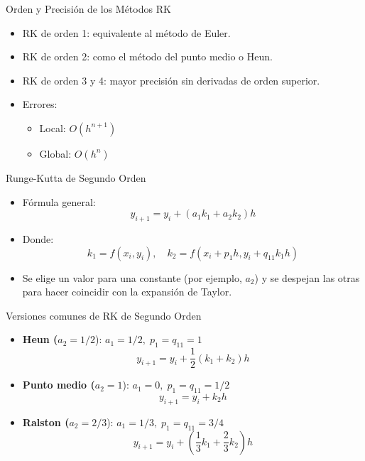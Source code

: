 \documentclass[main.tex]{subfiles}
\begin{document}
\begin{frame}{\small Orden y Precisión de los Métodos RK}
\begin{itemize}
  \item RK de orden 1: equivalente al método de Euler.
  \item RK de orden 2: como el método del punto medio o Heun.
  \item RK de orden 3 y 4: mayor precisión sin derivadas de orden superior.
  \item Errores:
  \begin{itemize}
    \item Local: \( O(h^{n+1}) \)
    \item Global: \( O(h^n) \)
  \end{itemize}
\end{itemize}
\end{frame}
\begin{frame}{\small Runge-Kutta de Segundo Orden}
\begin{itemize}
  \item Fórmula general:
  \[
    y_{i+1} = y_i + (a_1 k_1 + a_2 k_2) h
  \]
  \item Donde:
  \[
    k_1 = f(x_i, y_i), \quad k_2 = f(x_i + p_1 h, y_i + q_{11} k_1 h)
  \]
  \item Se elige un valor para una constante (por ejemplo, \( a_2 \)) y se despejan las otras para hacer coincidir con la expansión de Taylor.
\end{itemize}
\end{frame}

\begin{frame}{\small Versiones comunes de RK de Segundo Orden}
\begin{itemize}
  \item \textbf{Heun (}\( a_2 = 1/2 \)): \( a_1 = 1/2,\; p_1 = q_{11} = 1 \)
  \[
    y_{i+1} = y_i + \frac{1}{2}(k_1 + k_2) h
  \]
  \item \textbf{Punto medio (}\( a_2 = 1 \)): \( a_1 = 0,\; p_1 = q_{11} = 1/2 \)
  \[
    y_{i+1} = y_i + k_2 h
  \]
  \item \textbf{Ralston (}\( a_2 = 2/3 \)): \( a_1 = 1/3,\; p_1 = q_{11} = 3/4 \)
  \[
    y_{i+1} = y_i + \left(\frac{1}{3}k_1 + \frac{2}{3}k_2\right) h
  \]
\end{itemize}
\end{frame}
\end{document}
